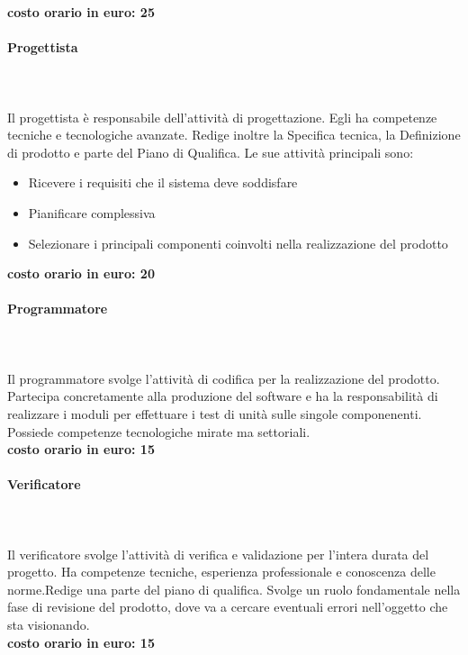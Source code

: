 \documentclass[../norme-di-progetto.tex]{subfiles}
\begin{document}
\textbf{costo orario in euro: 25}
\paragraph{Progettista}\mbox{}\\
\label{par:progettista}
\\Il progettista è responsabile dell'attività di progettazione.
Egli ha competenze tecniche e tecnologiche avanzate.
Redige inoltre la Specifica tecnica, la Definizione di prodotto e parte del Piano di Qualifica.
Le sue attività principali sono:

\begin{itemize}
  \item Ricevere i requisiti che il sistema deve soddisfare
  \item Pianificare  complessiva
  \item Selezionare i principali componenti coinvolti nella realizzazione del prodotto
\end{itemize}

\textbf{costo orario in euro: 20}
\paragraph{Programmatore}\mbox{}\\
\label{par:programmatore}
\\Il programmatore svolge l'attività di codifica per la realizzazione del prodotto.
Partecipa concretamente alla produzione del software e ha la responsabilità di realizzare i moduli per effettuare i test di unità sulle singole componenenti.
Possiede competenze tecnologiche mirate ma settoriali.
\\\newline\textbf{costo orario in euro: 15}
\paragraph{Verificatore}\mbox{}\\
\label{par:verificatore}
\\Il verificatore svolge l'attività di verifica e validazione per l'intera durata del progetto.
Ha competenze tecniche, esperienza professionale e conoscenza delle norme.Redige una parte del piano di qualifica.
Svolge un ruolo fondamentale nella fase di revisione del prodotto, dove va a cercare eventuali errori nell'oggetto che sta visionando.
\\\newline\textbf{costo orario in euro: 15}
\end{document}

